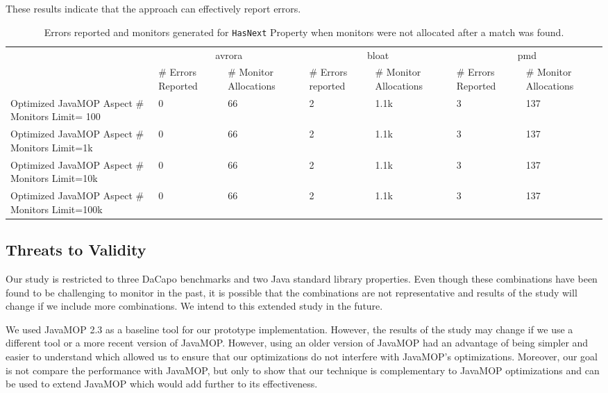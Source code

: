 These results indicate that the approach can effectively report errors.


\begin{table*}[ht]
\centering
\scriptsize
\begin{tabular}{|p{3.7cm}|p{1.2cm}|p{1.5cm}|p{1.2cm}|p{1.5cm}|p{1.2cm}|p{1.5cm}|
}
\hline
\multirow{2}{*}{}               & \multicolumn{2}{c|}{avrora}             & 
\multicolumn{2}{c|}{bloat}            & \multicolumn{2}{c|}{pmd}              \\ 
\cline{2-7} 
                                       & \# Errors Reported  & \# Monitor 
Allocations & \# Errors reported & \# Monitor Allocations& \# Errors Reported & 
\# Monitor Allocations\\ \hline
Optimized JavaMOP Aspect \# Monitors Limit= 100            & 0             & 66  
          & 2           & 1.1k              & 3               & 137     \\ 
\hline
Optimized JavaMOP Aspect \# Monitors Limit=1k           & 0             & 66     
      & 2            & 1.1k              & 3               & 137       \\ \hline
Optimized JavaMOP Aspect \# Monitors Limit=10k        & 0             & 66      
     & 2            & 1.1k              & 3               &137       \\ \hline
Optimized JavaMOP Aspect \# Monitors Limit=100k      & 0             & 66       
    & 2            & 1.1k              & 3               & 137       \\ \hline
\end{tabular}
\caption{Errors reported and monitors generated for \texttt{HasNext} Property 
when monitors were not allocated after a match was found.}
\end{table*}
\label{table:errorreporting2}


\subsection{Threats to Validity}
\label{subsec:threats}

Our study is restricted to three DaCapo benchmarks and two Java standard library 
properties. Even though these combinations have been found to be challenging to 
monitor in the past, it is possible that the combinations are not representative 
and results of the study will change if we include more combinations. We intend 
to this extended study in the future.

We used JavaMOP 2.3 as a baseline tool for our prototype implementation. 
However, the results of the study may change if we use a different tool or a 
more recent version of JavaMOP. However, using an older version of JavaMOP had 
an advantage of being simpler and easier to understand which allowed us to 
ensure that our optimizations do not interfere with JavaMOP's optimizations. 
Moreover, our goal is not compare the performance with JavaMOP, but only to show 
that our technique is complementary to JavaMOP optimizations and can be used to 
extend JavaMOP which would add further to its effectiveness.

